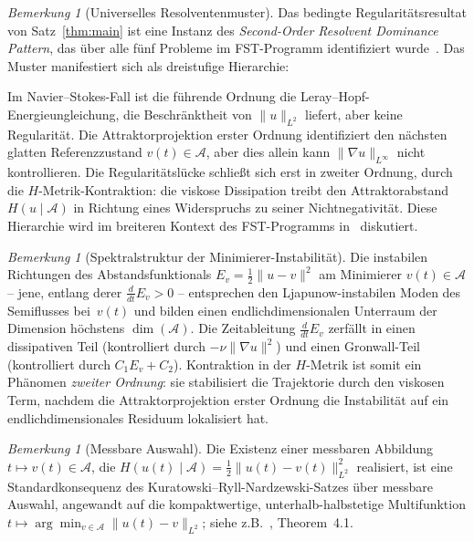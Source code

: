 \documentclass[12pt,a4paper]{article}
\theoremstyle{definition}
\theoremstyle{plain}
\theoremstyle{remark}
\newtheorem{remark}[definition]{Bemerkung}
\begin{document}
\begin{remark}[Universelles Resolventenmuster]\label{rem:universal-resolvent}
Das bedingte Regularitätsresultat von Satz~\ref{thm:main} ist eine Instanz des
\emph{Second-Order Resolvent Dominance Pattern}, das über alle fünf
Probleme im FST-Programm identifiziert wurde~\cite{FST-Unified2026}. Das Muster manifestiert sich als
dreistufige Hierarchie:

\noindent
Im Navier--Stokes-Fall ist die führende Ordnung die Leray--Hopf-Energieungleichung,
die Beschränktheit von $\|u\|_{L^2}$ liefert, aber keine Regularität.
Die Attraktorprojektion erster Ordnung identifiziert den nächsten glatten
Referenzzustand $v(t) \in \mathcal{A}$, aber dies allein kann
$\|\nabla u\|_{L^\infty}$ nicht kontrollieren. Die Regularitätslücke schließt sich erst in zweiter
Ordnung, durch die $H$-Metrik-Kontraktion: die viskose Dissipation
treibt den Attraktorabstand $H(u \mid \mathcal{A})$ in Richtung eines
Widerspruchs zu seiner Nichtnegativität.  Diese Hierarchie wird im
breiteren Kontext des FST-Programms in~\cite{FST-Unified2026} diskutiert.
\end{remark}

\begin{remark}[Spektralstruktur der Minimierer-Instabilität]
\label{rem:resolvent-minimiser}
Die instabilen Richtungen des Abstandsfunktionals $E_v = \frac{1}{2}\|u-v\|^2$
am Minimierer $v(t) \in \mathcal{A}$ -- jene, entlang derer
$\frac{d}{dt}E_v > 0$ -- entsprechen den Ljapunow-instabilen Moden des
Semiflusses bei~$v(t)$ und bilden einen endlichdimensionalen Unterraum
der Dimension höchstens $\dim(\mathcal{A})$. Die Zeitableitung $\frac{d}{dt}E_v$
zerfällt in einen dissipativen Teil (kontrolliert durch $-\nu\|\nabla u\|^2$)
und einen Gronwall-Teil (kontrolliert durch $C_1 E_v + C_2$). Kontraktion in der
$H$-Metrik ist somit ein Phänomen \emph{zweiter Ordnung}: sie stabilisiert die
Trajektorie durch den viskosen Term, nachdem die Attraktorprojektion erster Ordnung
die Instabilität auf ein endlichdimensionales Residuum lokalisiert hat.
\end{remark}

\begin{remark}[Messbare Auswahl]
\label{rem:selection}
Die Existenz einer messbaren Abbildung $t\mapsto v(t)\in\mathcal{A}$, die
$H(u(t)\mid\mathcal{A}) = \tfrac12\|u(t)-v(t)\|_{L^2}^2$ realisiert, ist eine Standardkonsequenz des Kuratowski--Ryll-Nardzewski-Satzes über messbare Auswahl, angewandt
auf die kompaktwertige, unterhalb-halbstetige Multifunktion
$t\mapsto \arg\min_{v\in\mathcal{A}}\|u(t)-v\|_{L^2}$; siehe z.B.\ \cite{Wagner1977}, Theorem~4.1.
\end{remark}
\end{document}
